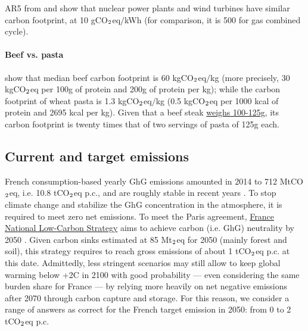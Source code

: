 \documentclass[english,5p,authoryear]{elsarticle}
\begin{document}
\begin{appendices}
AR5 from \citet{ar5_ar5_nodate} and \citet{pehl_understanding_2017} show that nuclear power plants and wind turbines have similar carbon footprint, at 10 gCO$_\textnormal{2}$eq$/$kWh (for comparison, it is 500 for gas combined cycle).

\paragraph{Beef vs. pasta}

\citet{poore_reducing_2018} show that median beef carbon footprint is 60 kgCO$_\textnormal{2}$eq$/$kg (more precisely, 30 kgCO$_\textnormal{2}$eq per 100g of protein and 200g of protein per kg); while the carbon footprint of wheat pasta is 1.3 kgCO$_\textnormal{2}$eq$/$kg (0.5 kgCO$_\textnormal{2}$eq per 1000 kcal of protein and 2695 kcal per kg). Given that a beef steak \hyperlink{http://www.lessentieldesviandes-pro.org/introduction.php}{weighs 100-125g}, its carbon footprint is twenty times that of two servings of pasta of 125g each. 

\subsection{Current and target emissions\label{app:emission}}

French consumption-based yearly GhG emissions amounted in 2014 to 712 MtCO$_\textnormal{2}$eq, i.e. 10.8 tCO$_\textnormal{2}$eq p.c., and are roughly stable in recent years \citep{cgdd_chiffres_2019}. To stop climate change and stabilize the GhG concentration in the atmosphere, it is required to meet zero net emissions. To meet the Paris agreement,  \hyperlink{https://www.ecologique-solidaire.gouv.fr/strategie-nationale-bas-carbone-snbc}{France National Low-Carbon Strategy} aims to achieve carbon (i.e. GhG) neutrality by 2050 \citep{ministry_of_ecology_france_2015}. Given carbon sinks estimated at 85 Mt$_\textnormal{2}$eq for 2050 (mainly forest and soil), this strategy requires to reach gross emissions of about 1 tCO$_\textnormal{2}$eq p.c. at this date. Admittedly, less stringent scenarios may still allow to keep global warming below +2\textdegree{}C in 2100 with good probability --- even considering the same burden share for France --- by relying more heavily on net negative emissions after 2070 through carbon capture and storage. For this reason, we consider a range of answers as correct for the French target emission in 2050: from 0 to 2 tCO$_\textnormal{2}$eq p.c.



\end{appendices}
\end{document}
